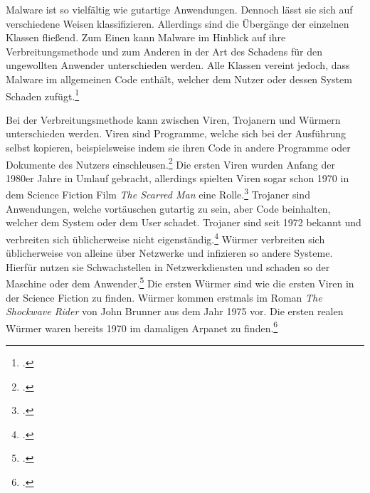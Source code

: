 Malware ist so vielfältig wie gutartige Anwendungen. Dennoch lässt sie sich auf verschiedene Weisen
klassifizieren. Allerdings sind die Übergänge der einzelnen Klassen fließend. Zum Einen kann
Malware im Hinblick auf ihre Verbreitungsmethode und zum Anderen in der Art des Schadens für den
ungewollten Anwender unterschieden werden. Alle Klassen vereint jedoch, dass Malware im allgemeinen
Code enthält, welcher dem Nutzer oder dessen System Schaden zufügt.\footcite[Vgl.][95\psq]{netzwerkDatensicherheit}

Bei der Verbreitungsmethode kann zwischen Viren, Trojanern und Würmern unterschieden werden. Viren
sind Programme, welche sich bei der Ausführung selbst kopieren, beispielsweise indem sie ihren Code
in andere Programme oder Dokumente des Nutzers
einschleusen.\footcite[Vgl.][95]{netzwerkDatensicherheit} Die ersten Viren wurden Anfang der 1980er
Jahre in Umlauf gebracht, allerdings spielten Viren sogar schon 1970 in dem Science Fiction Film
\textit{The Scarred Man} eine Rolle.\footcite[Vgl.][14]{virusesMalware} Trojaner sind Anwendungen,
welche vortäuschen gutartig zu sein, aber Code beinhalten, welcher dem System oder dem User
schadet. Trojaner sind seit 1972 bekannt und verbreiten sich üblicherweise nicht
eigenständig.\footcite[Vgl.][12\psq]{virusesMalware} Würmer verbreiten sich üblicherweise von
alleine über Netzwerke und infizieren so andere Systeme. Hierfür nutzen sie Schwachstellen in
Netzwerkdiensten und schaden so der Maschine oder dem
Anwender.\footcite[Vgl.][95]{netzwerkDatensicherheit} Die ersten Würmer sind wie die ersten Viren
in der Science Fiction zu finden. Würmer kommen erstmals im Roman \textit{The Shockwave Rider}
von John Brunner aus dem Jahr 1975 vor. Die ersten realen Würmer waren bereits 1970 im damaligen Arpanet zu
finden.\footcite[Vgl.][15]{virusesMalware}


